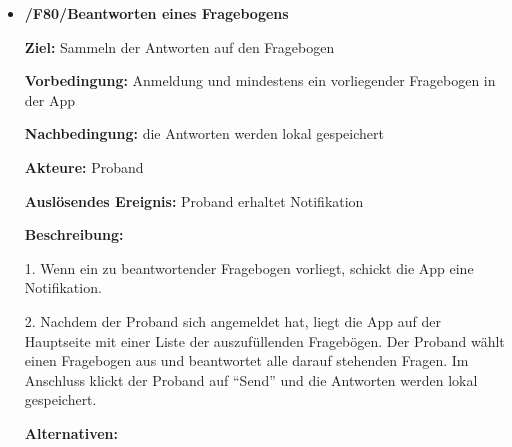 \documentclass[a4paper]{scrreprt}
\begin{document}
\begin{itemize}
            \item \textbf{/F80/Beantworten eines Fragebogens}

                \par \textbf{Ziel: }Sammeln der Antworten auf den Fragebogen
                \par \textbf{Vorbedingung: }Anmeldung und mindestens ein vorliegender Fragebogen in der App
                \par \textbf{Nachbedingung: }die Antworten werden lokal gespeichert
                \par \textbf{Akteure: }\gls{Proband}
                \par \textbf{Auslösendes Ereignis: }\gls{Proband} erhaltet Notifikation
                \par \textbf{Beschreibung: }
                \par 1. Wenn ein zu beantwortender Fragebogen vorliegt, schickt die App eine Notifikation.
                \par 2. Nachdem der \gls{Proband} sich angemeldet hat, liegt die App auf der Hauptseite mit einer Liste der auszufüllenden Fragebögen. Der \gls{Proband} wählt einen Fragebogen aus und beantwortet alle darauf stehenden Fragen. Im Anschluss klickt der \gls{Proband} auf ``Send'' und die Antworten werden lokal gespeichert.
                \par \textbf{Alternativen: }
                \begin{figure}[ht]
                    \centering

\end{figure}
\end{itemize}
\end{document}
